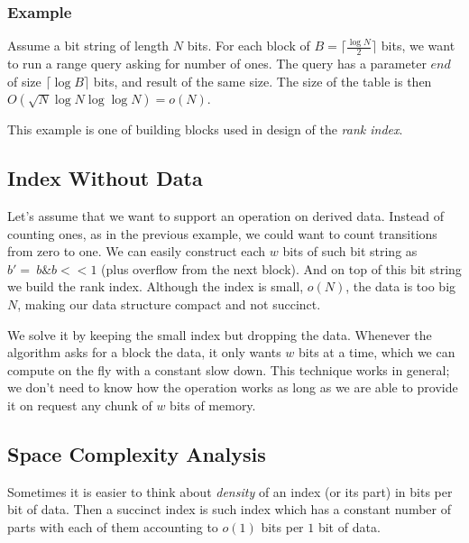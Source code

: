 \subsubsection{Example}

Assume a bit string of length $N$ bits.
For each block of $B = \lceil\frac{\log N}{2}\rceil$ bits, we want to run a range query asking for number of ones.
The query has a parameter $end$ of size $\lceil \log {B} \rceil$ bits, and result of the same size.
The size of the table is then $O(\sqrt{N} \log N \log\log N) = o(N)$.

This example is one of building blocks used in design of the \emph{rank index}.

\subsection{Index Without Data}

Let's assume that we want to support an operation on derived data.
Instead of counting ones, as in the previous example, we could want to count transitions from zero to one.
We can easily construct each $w$ bits of such bit string as $b' = ~b \& b<<1$ (plus overflow from the next block).
And on top of this bit string we build the rank index.
Although the index is small, $o(N)$, the data is too big $N$, making our data structure compact and not succinct.

We solve it by keeping the small index but dropping the data.
Whenever the algorithm asks for a block the data, it only wants $w$ bits at a time, which we can compute on the fly with a constant slow down.
This technique works in general; we don't need to know how the operation works as long as we are able to provide it on request any chunk of $w$ bits of memory.

\subsection{Space Complexity Analysis}

Sometimes it is easier to think about \emph{density} of an index (or its part) in bits per bit of data.
Then a succinct index is such index which has a constant number of parts with each of them accounting to $o(1)$ bits per $1$ bit of data.